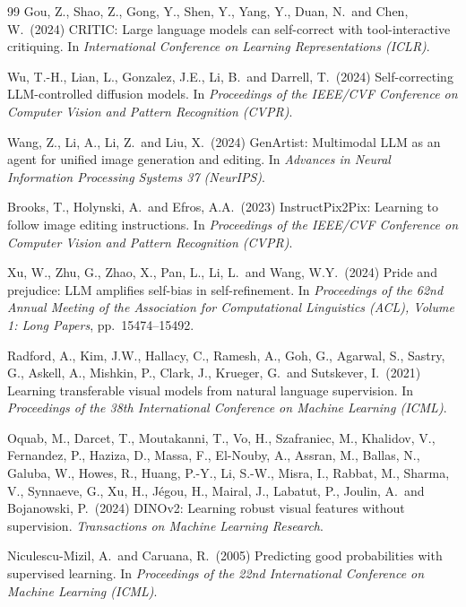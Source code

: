 \documentclass[10pt,twocolumn,letterpaper]{article}
\begin{document}
\begin{thebibliography}{99}
Gou, Z., Shao, Z., Gong, Y., Shen, Y., Yang, Y., Duan, N.\ and Chen, W.\ (2024)
CRITIC: Large language models can self-correct with tool-interactive critiquing.
In {\it International Conference on Learning Representations (ICLR)}.

Wu, T.-H., Lian, L., Gonzalez, J.E., Li, B.\ and Darrell, T.\ (2024)
Self-correcting LLM-controlled diffusion models.
In {\it Proceedings of the IEEE/CVF Conference on Computer Vision and Pattern Recognition (CVPR)}.

Wang, Z., Li, A., Li, Z.\ and Liu, X.\ (2024)
GenArtist: Multimodal LLM as an agent for unified image generation and editing.
In {\it Advances in Neural Information Processing Systems 37 (NeurIPS)}.

Brooks, T., Holynski, A.\ and Efros, A.A.\ (2023)
InstructPix2Pix: Learning to follow image editing instructions.
In {\it Proceedings of the IEEE/CVF Conference on Computer Vision and Pattern Recognition (CVPR)}.

Xu, W., Zhu, G., Zhao, X., Pan, L., Li, L.\ and Wang, W.Y.\ (2024)
Pride and prejudice: LLM amplifies self-bias in self-refinement.
In {\it Proceedings of the 62nd Annual Meeting of the Association for Computational Linguistics
(ACL), Volume 1: Long Papers}, pp.\ 15474--15492.

Radford, A., Kim, J.W., Hallacy, C., Ramesh, A., Goh, G., Agarwal, S., Sastry, G., Askell, A.,
Mishkin, P., Clark, J., Krueger, G.\ and Sutskever, I.\ (2021)
Learning transferable visual models from natural language supervision.
In {\it Proceedings of the 38th International Conference on Machine Learning (ICML)}.

Oquab, M., Darcet, T., Moutakanni, T., Vo, H., Szafraniec, M., Khalidov, V., Fernandez, P.,
Haziza, D., Massa, F., El-Nouby, A., Assran, M., Ballas, N., Galuba, W., Howes, R., Huang, P.-Y.,
Li, S.-W., Misra, I., Rabbat, M., Sharma, V., Synnaeve, G., Xu, H., J\'egou, H., Mairal, J.,
Labatut, P., Joulin, A.\ and Bojanowski, P.\ (2024)
DINOv2: Learning robust visual features without supervision.
{\it Transactions on Machine Learning Research}.

Niculescu-Mizil, A.\ and Caruana, R.\ (2005)
Predicting good probabilities with supervised learning.
In {\it Proceedings of the 22nd International Conference on Machine Learning (ICML)}.


\end{thebibliography}
\end{document}
